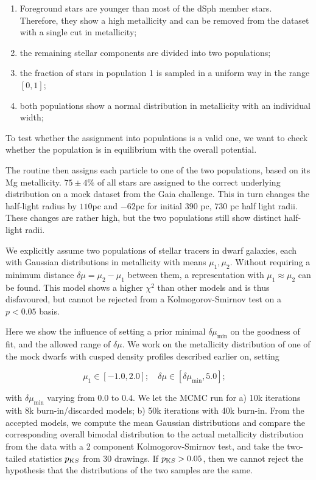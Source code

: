 \begin{enumerate}
\item Foreground stars are younger than most of the dSph member
  stars. Therefore, they show a high metallicity and can be removed
  from the dataset with a single cut in metallicity;
\item the remaining stellar components are divided into two
  populations;
\item the fraction of stars in population 1 is sampled in a uniform
  way in the range $[0,1]$;
\item both populations show a normal distribution in metallicity with
  an individual width;
\end{enumerate}

To test whether the assignment into populations is a valid one, we
want to check whether the population is in equilibrium with the
overall potential.

The routine then assigns each particle to one of the two populations,
based on its Mg metallicity. $75\pm4\%$ of all stars are assigned to
the correct underlying distribution on a mock dataset from the Gaia challenge. This
in turn changes the half-light radius by $110$pc and $-62$pc for
initial 390 pc, 730 pc half light radii. These changes are rather
high, but the two populations still show distinct half-light radii.

We explicitly assume two populations of stellar tracers in dwarf
galaxies, each with Gaussian distributions in metallicity with means
$\mu_1,\mu_2$. Without requiring a minimum distance $\delta
\mu=\mu_2-\mu_1$ between them, a representation with $\mu_1 \approx
\mu_2$ can be found. This model shows a higher $\chi^2$ than other
models and is thus disfavoured, but cannot be rejected from a
Kolmogorov-Smirnov test on a $p<0.05$ basis.

Here we show the influence of setting a prior minimal
$\delta\mu_{\min}$ on the goodness of fit, and the allowed range of
$\delta \mu$. We work on the metallicity distribution of one of the
mock dwarfs with cusped density profiles described earlier on, setting

\begin{equation} \mu_1\in[-1.0,2.0];\quad \delta \mu \in [
\delta\mu_{\min}, 5.0];\quad
\end{equation}

with $\delta\mu_{\min}$ varying from $0.0$ to $0.4$. We let the MCMC
run for a) 10k iterations with 8k burn-in/discarded models; b) 50k
iterations with 40k burn-in. From the accepted models, we compute the
mean Gaussian distributions and compare the corresponding overall
bimodal distribution to the actual metallicity distribution from the
data with a 2 component Kolmogorov-Smirnov test, and take the
two-tailed statistics $p_{\text KS}$ from 30 drawings. If $p_{\text
KS}>0.05$, then we cannot reject the hypothesis that the distributions
of the two samples are the same.

